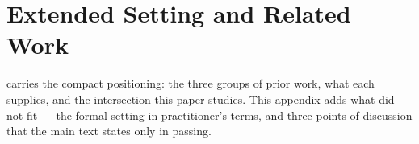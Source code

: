%
%

\section{Extended Setting and Related Work}
\label{app:related}

 carries the compact positioning: the three groups of prior work, what each
supplies, and the intersection this paper studies. This appendix adds what did not fit --- the
formal setting in practitioner's terms, and three points of discussion that the main text states
only in passing.

